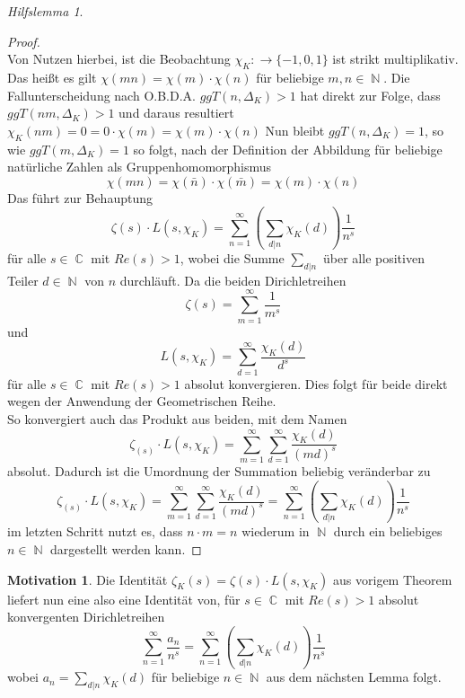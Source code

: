 \documentclass[10pt,a4paper]{article}
\theoremstyle{plain}
\theoremstyle{definition}
\newtheorem*{mot}{Motivation}
\theoremstyle{remark}
\newtheorem{hilfslem}{Hilfslemma}
\DeclareMathOperator{\C}{\mathbb{C}}
\DeclareMathOperator{\N}{\mathbb{N}}
\begin{document}
\begin{hilfslem}
\begin{proof}
 \\
Von Nutzen hierbei, ist die Beobachtung $\chi_K \colon \rightarrow \{-1,0,1\}$ ist strikt multiplikativ. Das heißt es gilt $\chi(mn)=\chi(m)\cdot\chi(n)$ für beliebige $m,n \in \N$. Die Fallunterscheidung nach O.B.D.A. $ggT(n,\Delta_K)>1$ hat direkt zur Folge, dass $ggT(nm,\Delta_K)>1$ und daraus resultiert $\chi_K(nm)=0=0\cdot \chi(m)= \chi(m)\cdot \chi(n)$
Nun bleibt $ggT(n,\Delta_K)=1$, so wie $ggT(m,\Delta_K)=1$ so folgt, nach der Definition der Abbildung für beliebige natürliche Zahlen als Gruppenhomomorphismus $$\chi(mn)=\chi(\bar{n})\cdot \chi(\bar{m})= \chi(m)\cdot \chi(n)$$
 Das führt zur Behauptung $$\zeta(s)\cdot L(s,\chi_K) = \sum_{n=1}^{\infty}(\sum_{d|n}\chi_K(d))\frac{1}{n^s}$$ für alle $s \in \C$ mit $Re(s) >1$, wobei die Summe $\sum_{d|n}$ über alle positiven Teiler $d \in \N$ von $n$ durchläuft. Da die beiden Dirichletreihen $$\zeta(s) = \sum_{m=1}^{\infty}\frac{1}{m^s} $$ und $$L(s,\chi_K)= \sum_{d=1}^{\infty}\frac{\chi_K(d)}{d^s}$$ für alle $s \in \C$ mit $Re(s) >1$ absolut konvergieren. Dies folgt für beide direkt wegen der Anwendung der Geometrischen Reihe.
 \\
 So konvergiert auch das Produkt aus beiden, mit dem Namen $$\zeta_(s) \cdot L(s,\chi_K) = \sum_{m=1}^{\infty} \sum_{d=1}^{\infty}\frac{\chi_K(d)}{(md)^s}$$ absolut.
 Dadurch ist die Umordnung der Summation beliebig veränderbar zu $$\zeta_(s) \cdot L(s,\chi_K)=\sum_{m=1}^{\infty} \sum_{d=1}^{\infty}\frac{\chi_K(d)}{(md)^s}= \sum_{n=1}^{\infty}(\sum_{d|n}\chi_K(d))\frac{1}{n^s}$$ im letzten Schritt nutzt es, dass $n \cdot m = n$ wiederum in $\N$ durch ein beliebiges $n \in \N$ dargestellt werden kann.
 \end{proof}
 \end{hilfslem}

 
\begin{mot}
Die Identität  $\zeta_K(s) = \zeta(s)\cdot L(s,\chi_K) $ aus vorigem Theorem liefert nun eine also eine Identität von, für $s \in \C$ mit $Re(s) > 1$ absolut konvergenten Dirichletreihen$$ \sum_{n=1}^{\infty}\frac{a_n}{n^s}= \sum_{n=1}^{\infty}(\sum_{d|n}\chi_K(d))\frac{1}{n^s}$$
wobei $a_n = \sum_{d|n}\chi_K(d)$ für beliebige $n \in \N$ aus dem nächsten Lemma folgt.
 \end{mot}
 
\end{document}
